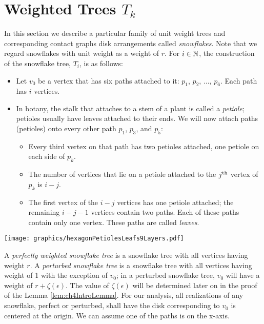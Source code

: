 \section{Weighted Trees $T_k$}
In this section we describe a particular family of unit weight trees and corresponding contact graphs disk arrangements called \textit{snowflakes}.  
Note that we regard snowflakes with unit weight as a weight of $r$.  
For $i \in {\mathbb{N}}$, the construction of the snowflake tree, $T_i$, is as follows:
\begin{itemize}
\item Let $v_0$ be a vertex that has six paths attached to it: $p_1$, $p_2$, $\dots$, $p_6$.  Each path has $i$ vertices.
\item In botany, the stalk that attaches to a stem of a plant is called a \textit{petiole}; petioles usually have leaves attached to their ends.  We will now attach paths (petioles) onto every other path $p_1$, $p_3$, and $p_5$: 
	\begin{itemize}
		\item 	Every third vertex on that path has two petioles attached, one petiole on each side of $p_k$. 
		\item	The number of vertices that lie on a petiole attached to the $j^\text{th}$ vertex of  $p_k$ is $i-j$.
		\item The first vertex of the $i-j$ vertices has one petiole attached; the remaining $i-j-1$ vertices contain two paths. Each of these paths contain only one vertex.  These paths are called \textit{leaves}. 
	\end{itemize}
\end{itemize}


\begin{minipage}{\linewidth}
\begin{center}
\texttt{[image: graphics/hexagonPetiolesLeafs9Layers.pdf]}
\label{fig:hexagonPetiolesLeafs9Layers.pdf}
\end{center}
\end{minipage}

A \textit{perfectly weighted snowflake tree} is a snowflake tree with all vertices having weight $r$.   
A \textit{perturbed snowflake tree} is a snowflake tree with all vertices having weight of 1 with the exception of $v_0$;  in a perturbed snowflake tree, $v_0$ will have a weight of $r + \zeta(\epsilon)$.  
The value of $\zeta (\epsilon)$ will be determined later on in the proof of the Lemma \ref{lem:ch4IntroLemma}.  
For our analysis, all realizations of any snowflake, perfect or perturbed, shall have the disk corresponding to $v_0$ is centered at the origin.  We can assume one of the paths is on the x-axis.  

